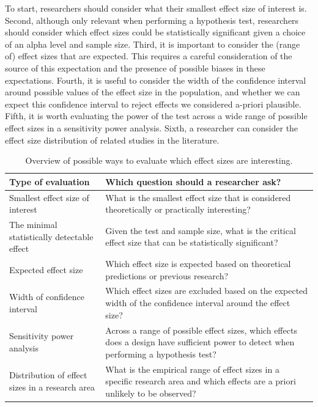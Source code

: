 \documentclass[
  oneside]{krantz}
\begin{document}
To start, researchers should consider what their smallest effect size of interest is. Second, although only relevant when performing a hypothesis test, researchers should consider which effect sizes could be statistically significant given a choice of an alpha level and sample size. Third, it is important to consider the (range of) effect sizes that are expected. This requires a careful consideration of the source of this expectation and the presence of possible biases in these expectations. Fourth, it is useful to consider the width of the confidence interval around possible values of the effect size in the population, and whether we can expect this confidence interval to reject effects we considered a-priori plausible. Fifth, it is worth evaluating the power of the test across a wide range of possible effect sizes in a sensitivity power analysis. Sixth, a researcher can consider the effect size distribution of related studies in the literature.

\begin{table}

\caption{\label{tab:table-effect-eval}Overview of possible ways to evaluate which effect sizes are interesting.}
\centering
\begin{tabular}[t]{>{\raggedright\arraybackslash}p{5cm}|>{\raggedright\arraybackslash}p{10cm}}
\hline
Type of evaluation & Which question should a researcher ask?\\
\hline
Smallest effect size of interest & What is the smallest effect size that is considered theoretically or practically interesting?\\
\hline
The minimal statistically detectable effect & Given the test and sample size, what is the critical effect size that can be statistically significant?\\
\hline
Expected effect size & Which effect size is expected based on theoretical predictions or previous research?\\
\hline
Width of confidence interval & Which effect sizes are excluded based on the expected width of the confidence interval around the effect size?\\
\hline
Sensitivity power analysis & Across a range of possible effect sizes, which effects does a design have sufficient power to detect when performing a hypothesis test?\\
\hline
Distribution of effect sizes in a research area & What is the empirical range of effect sizes in a specific research area and which effects are a priori unlikely to be observed?\\
\hline
\end{tabular}
\end{table}
\end{document}

